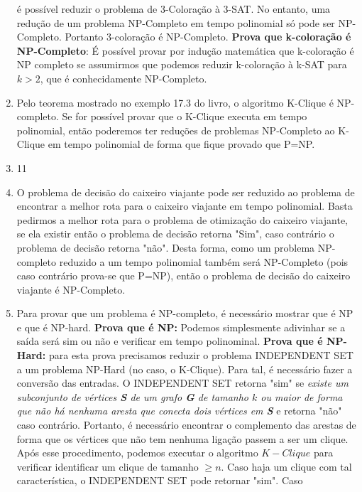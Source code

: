 \documentclass[11pt]{article}
\begin{document}
\begin{enumerate}
        é possível reduzir o problema de 3-Coloração à 3-SAT. No entanto, uma
        redução de um problema NP-Completo em tempo polinomial só pode ser
        NP-Completo. Portanto 3-coloração é NP-Completo. \textbf{Prova que
        k-coloração é NP-Completo}: É possível provar por indução matemática
        que k-coloração é NP completo se assumirmos que podemos reduzir
        k-coloração à k-SAT para $k>2$, que é conhecidamente NP-Completo.
    \item Pelo teorema mostrado no exemplo 17.3 do livro, o algoritmo K-Clique
        é NP-completo. Se for possível provar que o K-Clique executa em tempo
        polinomial, então poderemos ter reduções de problemas NP-Completo ao
        K-Clique em tempo polinomial de forma que fique provado que P=NP.
    \item 11
    \item O problema de decisão do caixeiro viajante pode ser reduzido ao
        problema de encontrar a melhor rota para o caixeiro viajante em tempo
        polinomial. Basta pedirmos a melhor rota para o problema de otimização
        do caixeiro viajante, se ela existir então o problema de decisão
        retorna "Sim", caso contrário o problema de decisão retorna "não".
        Desta forma, como um problema NP-completo reduzido a um tempo
        polinomial também será NP-Completo (pois caso contrário prova-se que
        P=NP), então o problema de decisão do caixeiro viajante é NP-Completo.
    \item Para provar que um problema é NP-completo, é necessário mostrar que é
        NP e que é NP-hard. \textbf{Prova que é NP:} Podemos simplesmente
        adivinhar se a saída será sim ou não e verificar em tempo polinominal.
        \textbf{Prova que é NP-Hard:} para esta prova precisamos reduzir o
        problema INDEPENDENT SET a um problema NP-Hard (no caso, o K-Clique).
        Para tal, é necessário fazer a conversão das entradas. O INDEPENDENT
        SET retorna "sim" se \textit{existe um subconjunto de vértices
        \textbf{S} de um grafo \textbf{G} de tamanho $k$ ou maior de forma que
    não há nenhuma aresta que conecta dois vértices em \textbf{S}} e retorna
    "não" caso contrário. Portanto, é necessário encontrar o complemento das
    arestas de forma que os vértices que não tem nenhuma ligação passem a ser
    um clique. Após esse procedimento, podemos executar o algoritmo $K-Clique$
    para verificar identificar um clique de tamanho $\geq n$. Caso haja um
    clique com tal característica, o INDEPENDENT SET pode retornar "sim". Caso

\end{enumerate}
\end{document}
